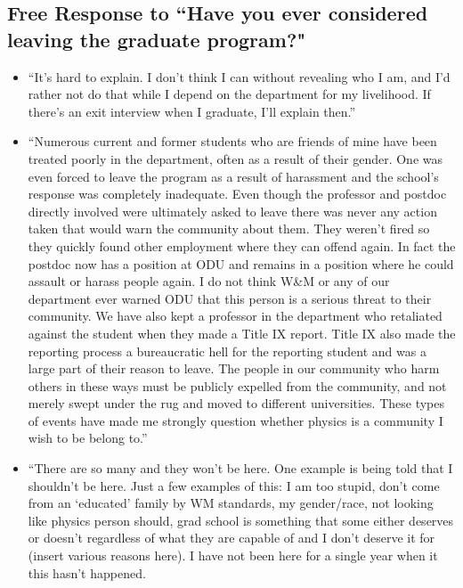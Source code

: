 \documentclass[oneside]{book}   %
\begin{document}
\subsection{Free Response to ``Have you ever considered leaving the graduate program?"}
\label{subsec:leave}
\begin{itemize}
	\item “It's hard to explain. I don't think I can without revealing who I am, and I'd rather not do that while I depend on the department for my livelihood. If there's an exit interview when I graduate, I'll explain then.”
	\item “Numerous current and former students who are friends of mine have been treated poorly in the department, often as a result of their gender. One was even forced to leave the program as a result of harassment and the school’s response was completely inadequate. Even though the professor and postdoc directly involved were ultimately asked to leave there was never any action taken that would warn the community about them. They weren’t fired so they quickly found other employment where they can offend again. In fact the postdoc now has a position at ODU and remains in a position where he could assault or harass people again. I do not think W\&M or any of our department ever warned ODU that this person is a serious threat to their community. We have also kept a professor in the department who retaliated against the student when they made a Title IX report. Title IX also made the reporting process a bureaucratic hell for the 	reporting student and was a large part of their reason to leave. The people in our community who harm others in these ways must be publicly expelled from the community, and not merely swept under the rug and moved to different universities. These types of events have made me strongly question whether physics is a community I wish to be belong to.”
	\item “There are so many and they won't be here. One example is being told that I 	shouldn't be here. Just a few examples of this: I am too stupid, don't come from an ‘educated’ family by WM standards, my gender/race, not looking like physics person should, grad school is something that some either deserves or doesn't regardless of what they are capable of and I don't deserve it for (insert various reasons here). I have not been here for a single year when it this hasn't happened.


\end{itemize}
\end{document}
